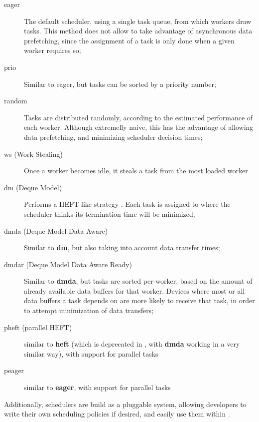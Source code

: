 \documentclass[main.tex]{subfiles}
\begin{document}
\begin{description}

\item[eager] The default scheduler, using a single task queue, from which workers draw tasks. This method does not allow to take advantage of asynchronous data prefetching, since the assignment of a task is only done when a given worker requires so;

\item[prio] Similar to eager, but tasks can be sorted by a priority number;

\item[random] Tasks are distributed randomly, according to the estimated performance of each worker. Although extremelly naive, this has the advantage of allowing data prefetching, and minimizing scheduler decision times;

\item[ws (Work Stealing)] Once a worker becomes idle, it steals a task from the most loaded worker

\item[dm (Deque Model)] Performs a HEFT-like strategy . Each task is assigned to where the scheduler thinks its termination time will be minimized;

\item[dmda (Deque Model Data Aware)] Similar to \textbf{dm}, but also taking into account data transfer times;

\item[dmdar (Deque Model Data Aware Ready)] Similar to \textbf{dmda}, but tasks are sorted per-worker, based on the amount of already available data buffers for that worker. Devices where most or all data buffers a task depends on are more likely to receive that task, in order to attempt minimization of data transfers;

\item[pheft (parallel HEFT)] similar to \textbf{heft} (which is deprecated in \starpu, with \textbf{dmda} working in a very similar way), with support for parallel tasks

\item[peager] similar to \textbf{eager}, with support for parallel tasks

\end{description}

Additionally, schedulers are build as a pluggable system, allowing developers to write their own scheduling policies if desired, and easily use them within \starpu.

\end{document}
